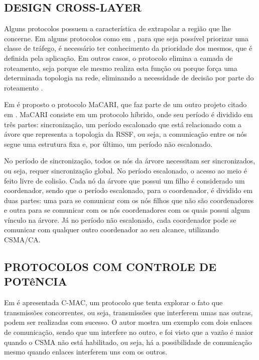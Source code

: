 \documentclass[12pt]{article}
\begin{document}
  \subsection{DESIGN CROSS-LAYER}
    Alguns protocolos possuem a característica de extrapolar a região que lhe concerne. Em alguns protocolos como em \cite{20083811560517, 20092612148942}, para que seja possível priorizar uma classe de tráfego, é necessário ter conhecimento da prioridade dos mesmos, que é definida pela aplicação. Em outros casos, o protocolo elimina a camada de roteamento, seja porque ele mesmo realiza esta função \cite{20100312645920} ou porque força uma determinada topologia na rede, eliminando a necessidade de decisão por parte do roteamento \cite{20092812183087, 20093812310584}.

    Em \cite {20092812183087} é proposto o protocolo MaCARI, que faz parte de um outro projeto citado em \cite{20092812183087}. MaCARI consiste em um protocolo híbrido, onde seu período é dividido em três partes: sincronização, um período escalonado que está relacionado com a ávore que representa a topologia da RSSF, ou seja, a comunicação entre os nós segue uma estrutura fixa e, por último, um período não escalonado.
    
    No período de sincronização, todos os nós da árvore necessitam ser sincronizados, ou seja, requer sincronização global. No período escalonado, o acesso ao meio é feito livre de colisão. Cada nó da árvore que possui um filho é considerado um coordenador, sendo que o período escalonado, para o coordenador, é dividido em duas partes: uma para se comunicar com os nós filhos que não são coordenadores e outra para se comunicar com os nós coordenadores com os quais possui algum vínculo na árvore. Já no período não escalonado, cada coordenador pode se comunicar com qualquer outro coordenador ao seu alcance, utilizando CSMA/CA.

  \subsection{PROTOCOLOS COM CONTROLE DE POTêNCIA}
    Em \cite{20094212373426} é apresentada C-MAC, um protocolo que tenta explorar o fato que transmissões concorrentes, ou seja, transmissões que interferem umas nas outras, podem ser realizadas com sucesso. O autor mostra um exemplo com dois enlaces de comunicação, sendo que um interfere no outro, e foi visto que a vazão é maior quando o CSMA não está habilitado, ou seja, há a possibilidade de comunicação mesmo quando enlaces interferem uns com os outros.
\end{document}

